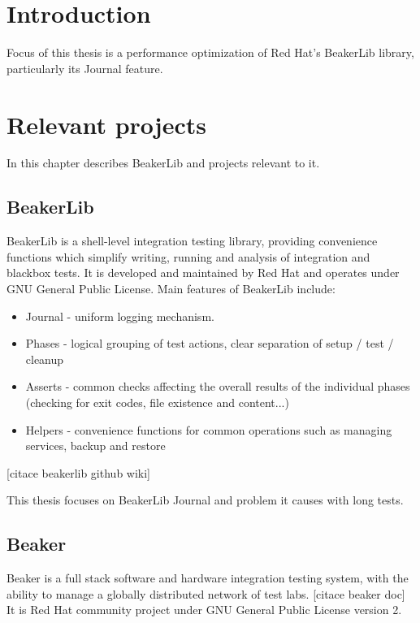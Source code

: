 
\chapter{Introduction}

Focus of this thesis is a performance optimization of Red Hat's BeakerLib library, particularly its Journal feature. 

\chapter{Relevant projects}

In this chapter describes BeakerLib and projects relevant to it.

\section{BeakerLib}

BeakerLib is a shell-level integration testing library, providing convenience functions which simplify writing, running and analysis of integration and blackbox tests. 
It is developed and maintained by Red Hat and operates under GNU General Public License.
Main features of BeakerLib include:
\begin{itemize}
\item Journal - uniform logging mechanism. 
\item Phases - logical grouping of test actions, clear separation of setup / test / cleanup
\item Asserts - common checks affecting the overall results of the individual phases (checking for exit codes, file existence and content...)
\item Helpers - convenience functions for common operations such as managing services, backup and restore 
\end{itemize}
[citace beakerlib github wiki]

This thesis focuses on BeakerLib Journal and problem it causes with long tests.


\section{Beaker}

Beaker is a full stack software and hardware integration testing system, with the ability to manage a globally distributed network of test labs.  [citace beaker doc] It is Red Hat community project under GNU General Public License version 2.

